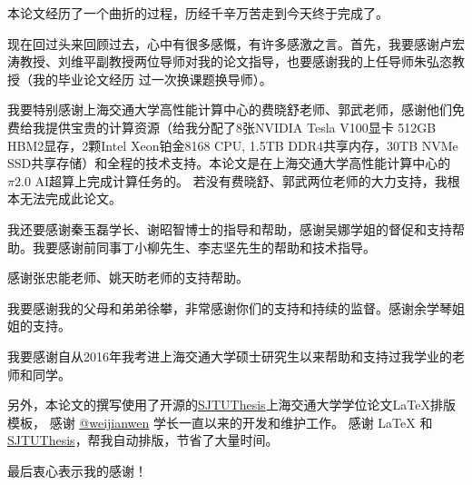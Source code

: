 
\begin{acknowledgements}
  本论文经历了一个曲折的过程，历经千辛万苦走到今天终于完成了。

  现在回过头来回顾过去，心中有很多感慨，有许多感激之言。首先，我要感谢卢宏涛教授、刘维平副教授两位导师对我的论文指导，也要感谢我的上任导师朱弘恣教授（我的毕业论文经历
  过一次换课题换导师）。

  我要特别感谢上海交通大学高性能计算中心的费晓舒老师、郭武老师，感谢他们免费给我提供宝贵的计算资源（给我分配了8张NVIDIA Tesla V100显卡 512GB HBM2显存，2颗Intel Xeon铂金8168 CPU, 
  1.5TB DDR4共享内存，30TB NVMe SSD共享存储）和全程的技术支持。本论文是在上海交通大学高性能计算中心的$\pi 2.0$ AI超算上完成计算任务的。
  若没有费晓舒、郭武两位老师的大力支持，我根本无法完成此论文。

  我还要感谢秦玉磊学长、谢昭智博士的指导和帮助，感谢吴娜学姐的督促和支持帮助。我要感谢前同事丁小柳先生、李志坚先生的帮助和技术指导。

  感谢张忠能老师、姚天昉老师的支持帮助。

  我要感谢我的父母和弟弟徐攀，非常感谢你们的支持和持续的监督。感谢余学琴姐姐的支持。

  我要感谢自从2016年我考进上海交通大学硕士研究生以来帮助和支持过我学业的老师和同学。

  另外，本论文的撰写使用了开源的\href{https://github.com/sjtug/SJTUThesis}{SJTUThesis}上海交通大学学位论文\LaTeX{}排版模板， 
  感谢 \href{https://github.com/weijianwen}{@weijianwen} 学长一直以来的开发和维护工作。
  感谢 \LaTeX{} 和 \href{https://github.com/sjtug/SJTUThesis}{SJTUThesis}，帮我自动排版，节省了大量时间。

  最后衷心表示我的感谢！


\end{acknowledgements}
